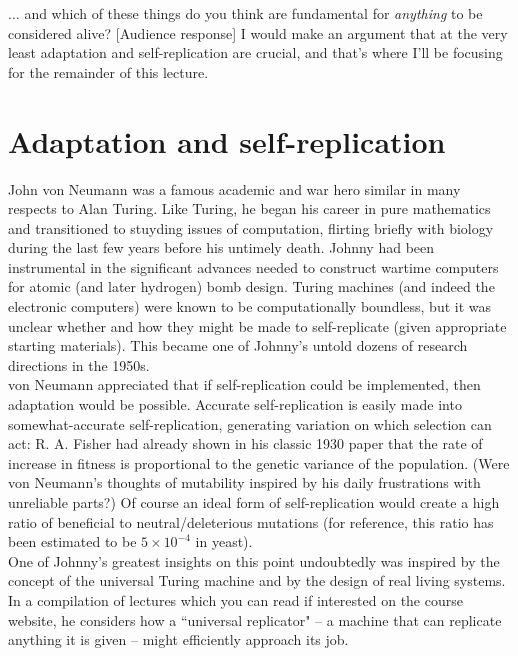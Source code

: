 \documentclass{article}
\begin{document}
$\ldots$ and which of these things do you think are fundamental for \textit{anything} to be considered alive? [Audience response] I would make an argument that at the very least adaptation and self-replication are crucial, and that's where I'll be focusing for the remainder of this lecture.

\section*{Adaptation and self-replication}

John von Neumann was a famous academic and war hero similar in many respects to Alan Turing. Like Turing, he began his career in pure mathematics and transitioned to stuyding issues of computation, flirting briefly with biology during the last few years before his untimely death. Johnny had been instrumental in the significant advances needed to construct wartime computers for atomic (and later hydrogen) bomb design. Turing machines (and indeed the electronic computers) were known to be computationally boundless, but it was unclear whether and how they might be made to self-replicate (given appropriate starting materials). This became one of Johnny's untold dozens of research directions in the 1950s.\\

von Neumann appreciated that if self-replication could be implemented, then adaptation would be possible. Accurate self-replication is easily made into somewhat-accurate self-replication, generating variation on which selection can act: R. A. Fisher had already shown in his classic 1930 paper that the rate of increase in fitness is proportional to the genetic variance of the population. (Were von Neumann's thoughts of mutability inspired by his daily frustrations with unreliable parts?) Of course an ideal form of self-replication would create a high ratio of beneficial to neutral/deleterious mutations (for reference, this ratio has been estimated to be $5 \times 10^{-4}$ in yeast).\\

One of Johnny's greatest insights on this point undoubtedly was inspired by the concept of the universal Turing machine and by the design of real living systems. In a compilation of lectures which you can read if interested on the course website, he considers how a ``universal replicator" -- a machine that can replicate anything it is given -- might efficiently approach its job.\\
\end{document}

